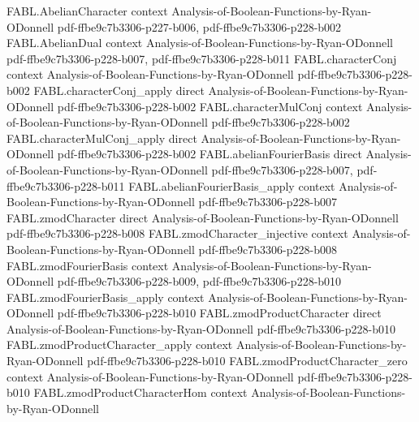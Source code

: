 \begin{theorem}
\label{FABL.zmodProductCharacter_neg}
\leanok
{}
\proofstep
  {FABL.AbelianCharacter}
  {context}
  {Analysis-of-Boolean-Functions-by-Ryan-ODonnell}
  {pdf-ffbe9c7b3306-p227-b006,
    pdf-ffbe9c7b3306-p228-b002}
\proofstep
  {FABL.AbelianDual}
  {context}
  {Analysis-of-Boolean-Functions-by-Ryan-ODonnell}
  {pdf-ffbe9c7b3306-p228-b007,
    pdf-ffbe9c7b3306-p228-b011}
\proofstep
  {FABL.characterConj}
  {context}
  {Analysis-of-Boolean-Functions-by-Ryan-ODonnell}
  {pdf-ffbe9c7b3306-p228-b002}
\proofstep
  {FABL.characterConj_apply}
  {direct}
  {Analysis-of-Boolean-Functions-by-Ryan-ODonnell}
  {pdf-ffbe9c7b3306-p228-b002}
\proofstep
  {FABL.characterMulConj}
  {context}
  {Analysis-of-Boolean-Functions-by-Ryan-ODonnell}
  {pdf-ffbe9c7b3306-p228-b002}
\proofstep
  {FABL.characterMulConj_apply}
  {direct}
  {Analysis-of-Boolean-Functions-by-Ryan-ODonnell}
  {pdf-ffbe9c7b3306-p228-b002}
\proofstep
  {FABL.abelianFourierBasis}
  {direct}
  {Analysis-of-Boolean-Functions-by-Ryan-ODonnell}
  {pdf-ffbe9c7b3306-p228-b007,
    pdf-ffbe9c7b3306-p228-b011}
\proofstep
  {FABL.abelianFourierBasis_apply}
  {context}
  {Analysis-of-Boolean-Functions-by-Ryan-ODonnell}
  {pdf-ffbe9c7b3306-p228-b007}
\proofstep
  {FABL.zmodCharacter}
  {direct}
  {Analysis-of-Boolean-Functions-by-Ryan-ODonnell}
  {pdf-ffbe9c7b3306-p228-b008}
\proofstep
  {FABL.zmodCharacter_injective}
  {context}
  {Analysis-of-Boolean-Functions-by-Ryan-ODonnell}
  {pdf-ffbe9c7b3306-p228-b008}
\proofstep
  {FABL.zmodFourierBasis}
  {context}
  {Analysis-of-Boolean-Functions-by-Ryan-ODonnell}
  {pdf-ffbe9c7b3306-p228-b009,
    pdf-ffbe9c7b3306-p228-b010}
\proofstep
  {FABL.zmodFourierBasis_apply}
  {context}
  {Analysis-of-Boolean-Functions-by-Ryan-ODonnell}
  {pdf-ffbe9c7b3306-p228-b010}
\proofstep
  {FABL.zmodProductCharacter}
  {direct}
  {Analysis-of-Boolean-Functions-by-Ryan-ODonnell}
  {pdf-ffbe9c7b3306-p228-b010}
\proofstep
  {FABL.zmodProductCharacter_apply}
  {context}
  {Analysis-of-Boolean-Functions-by-Ryan-ODonnell}
  {pdf-ffbe9c7b3306-p228-b010}
\proofstep
  {FABL.zmodProductCharacter_zero}
  {context}
  {Analysis-of-Boolean-Functions-by-Ryan-ODonnell}
  {pdf-ffbe9c7b3306-p228-b010}
\proofstep
  {FABL.zmodProductCharacterHom}
  {context}
  {Analysis-of-Boolean-Functions-by-Ryan-ODonnell}

\end{theorem}
